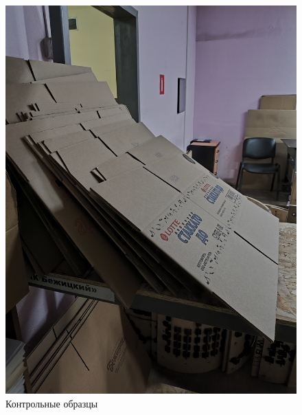\begin{figure}
\begin{center}
 \includegraphics[height=0.9\textheight, keepaspectratio]{Pics/VIIIконтрольныеобразцы.jpg}
\end{center}
 \caption{Контрольные образцы}
 \label{pic:/VIIIконтрольныеобразцы}
\end{figure}

